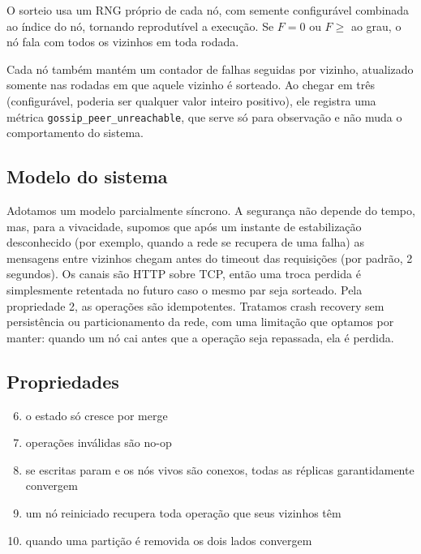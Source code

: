 \documentclass[conference,a4paper]{IEEEtran}
\begin{document}
O sorteio usa um RNG próprio de cada nó, com semente configurável combinada ao índice do nó, tornando reprodutível a execução. Se $F=0$ ou $F \ge$ ao grau, o nó fala com todos os vizinhos em toda rodada.

Cada nó também mantém um contador de falhas seguidas por vizinho, atualizado somente nas rodadas em que aquele vizinho é sorteado. Ao chegar em três (configurável, poderia ser qualquer valor inteiro positivo), ele registra uma métrica \texttt{gossip\_peer\_unreachable}, que serve só para observação e não muda o comportamento do sistema.

\subsection{Modelo do sistema}
Adotamos um modelo parcialmente síncrono. A segurança não depende do tempo, mas, para a vivacidade, supomos que após um instante de estabilização desconhecido (por exemplo, quando a rede se recupera de uma falha) as mensagens entre vizinhos chegam antes do timeout das requisições (por padrão, 2 segundos). Os canais são HTTP sobre TCP, então uma troca perdida é simplesmente retentada no futuro caso o mesmo par seja sorteado. Pela propriedade 2, as operações são idempotentes. Tratamos crash recovery sem persistência ou particionamento da rede, com uma limitação que optamos por manter: quando um nó cai antes que a operação seja repassada, ela é perdida.

\subsection{Propriedades}

\begin{enumerate}
    \setcounter{enumi}{5}
    \item o estado só cresce por merge
    \item operações inválidas são no-op
    \item se escritas param e os nós vivos são conexos, todas as réplicas garantidamente convergem
    \item um nó reiniciado recupera toda operação que seus vizinhos têm
    \item quando uma partição é removida os dois lados convergem
\end{enumerate}
\end{document}
